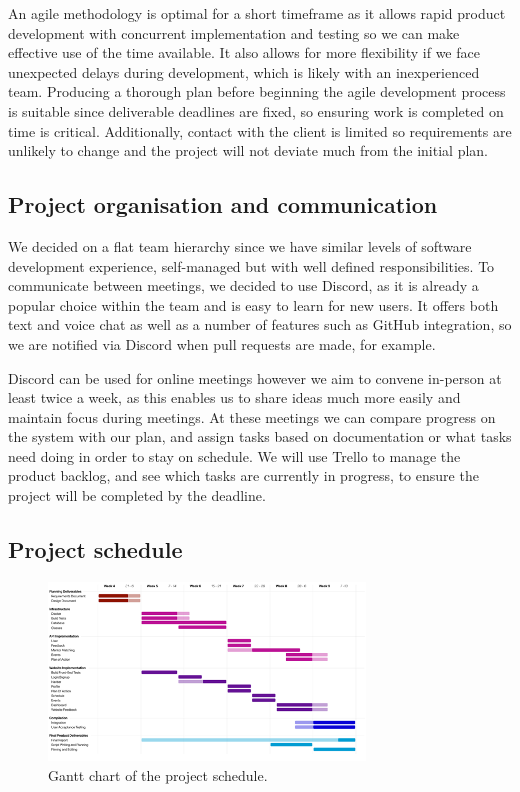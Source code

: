 \documentclass[10pt]{article}
\begin{document}
An agile methodology is optimal for a short timeframe as it allows rapid product
development with concurrent implementation and testing so we can make effective
use of the time available. It also allows for more flexibility if we face
unexpected delays during development, which is likely with an inexperienced
team. Producing a thorough plan before beginning the agile development process
is suitable since deliverable deadlines are fixed, so ensuring work is completed
on time is critical. Additionally, contact with the client is limited so
requirements are unlikely to change and the project will not deviate much from
the initial plan.


\subsection{Project organisation and communication}
We decided on a flat team hierarchy since we have similar levels of software
development experience, self-managed but with well defined responsibilities. To
communicate between meetings, we decided to use Discord, as it is already a
popular choice within the team and is easy to learn for new users. It offers
both text and voice chat as well as a number of features such as GitHub
integration, so we are notified via Discord when pull requests are made, for
example.

Discord can be used for online meetings however we aim to convene in-person at
least twice a week, as this enables us to share ideas much more easily and
maintain focus during meetings. At these meetings we can compare progress on the
system with our plan, and assign tasks based on documentation or what tasks need
doing in order to stay on schedule. We will use Trello to manage the product
backlog, and see which tasks are currently in progress, to ensure the project
will be completed by the deadline.


\subsection{Project schedule}
\begin{figure}[H]
    \centering
    \includegraphics[width=0.75\textwidth]{Timetable}
    \caption{Gantt chart of the project schedule.}
    \label{fig:project_schedule_gantt}
\end{figure}
\end{document}
